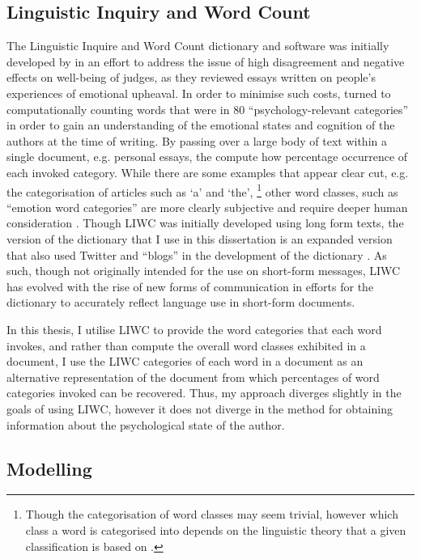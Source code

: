 \subsection{Linguistic Inquiry and Word Count}

The Linguistic Inquire and Word Count dictionary and software was initially developed by \citet{Pennebaker:2001} in an effort to address the issue of high disagreement and negative effects on well-being of judges, as they reviewed essays written on people's experiences of emotional upheaval. In order to minimise such costs, \citet{Pennebaker:2001} turned to computationally counting words that were in $80$ ``psychology-relevant categories'' in order to gain an understanding of the emotional states and cognition of the authors at the time of writing. By passing over a large body of text within a single document, e.g. personal essays, the \citet{Pennebaker:2001} compute how percentage occurrence of each invoked category. While there are some examples that appear clear cut, e.g. the categorisation of articles such as `a' and `the',
\footnote{Though the categorisation of word classes may seem trivial, however which class a word is categorised into depends on the linguistic theory that a given classification is based on \cite{CITE: Wait for Adina}.}
other word classes, such as ``emotion word categories'' are more clearly subjective and require deeper human consideration \citep{Tauscik:2010}.
Though LIWC was initially developed using long form texts, the version of the dictionary that I use in this dissertation is an expanded version that also used Twitter and ``blogs'' in the development of the dictionary \citep{Pennebaker:2015}. As such, though not originally intended for the use on short-form messages, LIWC has evolved with the rise of new forms of communication in efforts for the dictionary to accurately reflect language use in short-form documents.\vspace{5mm}

In this thesis, I utilise LIWC to provide the word categories that each word invokes, and rather than compute the overall word classes exhibited in a document, I use the LIWC categories of each word in a document as an alternative representation of the document from which percentages of word categories invoked can be recovered. Thus, my approach diverges slightly in the goals of using LIWC, however it does not diverge in the method for obtaining information about the psychological state of the author.

\subsection{Modelling}
